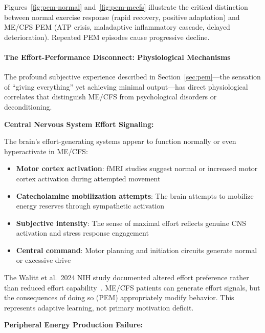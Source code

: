



Figures~\ref{fig:pem-normal} and~\ref{fig:pem-mecfs} illustrate the critical distinction between normal exercise response (rapid recovery, positive adaptation) and ME/CFS PEM (ATP crisis, maladaptive inflammatory cascade, delayed deterioration). Repeated PEM episodes cause progressive decline.

\paragraph{The Effort-Performance Disconnect: Physiological Mechanisms}

The profound subjective experience described in Section~\ref{sec:pem}---the sensation of ``giving everything'' yet achieving minimal output---has direct physiological correlates that distinguish ME/CFS from psychological disorders or deconditioning.

\textbf{Central Nervous System Effort Signaling:}

The brain's effort-generating systems appear to function normally or even hyperactivate in ME/CFS:

\begin{itemize}
    \item \textbf{Motor cortex activation}: fMRI studies suggest normal or increased motor cortex activation during attempted movement
    \item \textbf{Catecholamine mobilization attempts}: The brain attempts to mobilize energy reserves through sympathetic activation
    \item \textbf{Subjective intensity}: The sense of maximal effort reflects genuine CNS activation and stress response engagement
    \item \textbf{Central command}: Motor planning and initiation circuits generate normal or excessive drive
\end{itemize}

The Walitt et al.\ 2024 NIH study documented altered effort preference rather than reduced effort capability~\cite{walitt2024deep}. ME/CFS patients can generate effort signals, but the consequences of doing so (PEM) appropriately modify behavior. This represents adaptive learning, not primary motivation deficit.

\textbf{Peripheral Energy Production Failure:}

